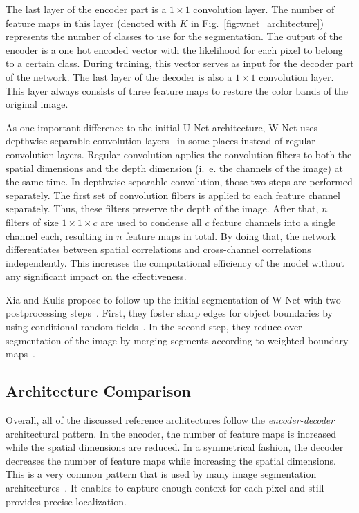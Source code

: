 The last layer of the encoder part is a $1\times 1$ convolution layer. The number of feature maps in this layer (denoted with $K$ in Fig.~\ref{fig:wnet_architecture}) represents the number of classes to use for the segmentation. The output of the encoder is a one hot encoded vector with the likelihood for each pixel to belong to a certain class. During training, this vector serves as input for the decoder part of the network. The last layer of the decoder is also a $1\times 1$ convolution layer. This layer always consists of three feature maps to restore the color bands of the original image.

As one important difference to the initial U-Net architecture, W-Net uses depthwise separable convolution layers~\cite{depthwise_conv17} in some places instead of regular convolution layers. Regular convolution applies the convolution filters to both the spatial dimensions and the depth dimension (i.~e. the channels of the image) at the same time. In depthwise separable convolution, those two steps are performed separately. The first set of convolution filters is applied to each feature channel separately. Thus, these filters preserve the depth of the image. After that, $n$ filters of size $1\times 1\times c$ are used to condense all $c$ feature channels into a single channel each, resulting in $n$ feature maps in total. By doing that, the network differentiates between spatial correlations and cross-channel correlations independently. This increases the computational efficiency of the model without any significant impact on the effectiveness.

Xia and Kulis propose to follow up the initial segmentation of W-Net with two postprocessing steps~\cite{wnet17}. First, they foster sharp edges for object boundaries by using conditional random fields~\cite{crf17}. In the second step, they reduce over-segmentation of the image by merging segments according to weighted boundary maps~\cite{hierarchy_imgseg11}.

\subsection{Architecture Comparison}
Overall, all of the discussed reference architectures follow the \emph{encoder-decoder} architectural pattern. In the encoder, the number of feature maps is increased while the spatial dimensions are reduced. In a symmetrical fashion, the decoder decreases the number of feature maps while increasing the spatial dimensions. This is a very common pattern that is used by many image segmentation architectures~\cite{imseg_survey20}. It enables to capture enough context for each pixel and still provides precise localization.

